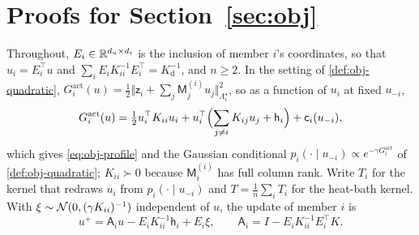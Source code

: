 \section{Proofs for \texorpdfstring{Section~\ref{sec:obj}}{conflicting objectives, deliberation time and scale selection}}\label{app:obj}

Throughout, $E_i\in\mathbb{R}^{d_u\times d_i}$ is the inclusion of member $i$'s coordinates, so that $u_i=E_i^\top u$ and $\sum_iE_iK_{ii}^{-1}E_i^\top=K_{\mathrm d}^{-1}$, and $n\ge2$. In the setting of \cref{def:obj-quadratic}, $G^{\mathrm{act}}_i(u)=\frac12\Vert\mathsf z_i+\sum_j\mathsf M^{(i)}_ju_j\Vert^2_{\Lambda^\star_i}$, so as a function of $u_i$ at fixed $u_{-i}$,
\begin{equation}\label{eq:obj-conditional}
G^{\mathrm{act}}_i(u)=\tfrac12u_i^\top K_{ii}u_i+u_i^\top\Bigl(\sum_{j\ne i}K_{ij}u_j+\mathsf h_i\Bigr)+\mathsf c_i(u_{-i}),
\end{equation}
which gives \eqref{eq:obj-profile} and the Gaussian conditional $p_i(\cdot\mid u_{-i})\propto e^{-\gamma G^{\mathrm{act}}_i}$ of \cref{def:obj-quadratic}; $K_{ii}\succ0$ because $\mathsf M^{(i)}_i$ has full column rank. Write $T_i$ for the kernel that redraws $u_i$ from $p_i(\cdot\mid u_{-i})$ and $T=\frac1n\sum_iT_i$ for the heat-bath kernel. With $\xi\sim\mathcal{N}(0,(\gamma K_{ii})^{-1})$ independent of $u$, the update of member $i$ is
\begin{equation}\label{eq:obj-update}
u^+=\mathsf A_iu-E_iK_{ii}^{-1}\mathsf h_i+E_i\xi,\qquad\mathsf A_i=I-E_iK_{ii}^{-1}E_i^\top K.
\end{equation}

